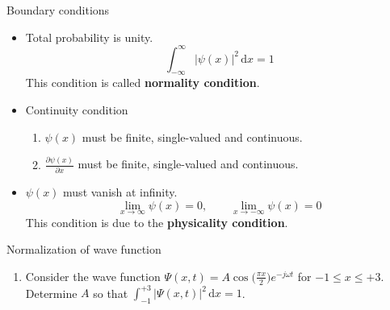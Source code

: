 \begin{frame}{Boundary conditions}
	\begin{itemize}
		\item Total probability is unity.
		\[
		\int_{-\infty}^{\infty} |\psi(x)|^2 \, \mathrm{d}x = 1
		\]
		This condition is called \textbf{normality condition}.
		\item Continuity condition
		\begin{enumerate}
			\item \(\psi(x)\) must be finite, single-valued and continuous.
			\item \(\tfrac{\partial\psi(x)}{\partial x}\) must be finite, single-valued and continuous.
		\end{enumerate}
		\item \(\psi(x)\) must vanish at infinity.
		\[
		\lim_{x\rightarrow\infty} \psi(x) = 0, \qquad \lim_{x\rightarrow -\infty} \psi(x) = 0
		\]
		This condition is due to the \textbf{physicality condition}.
	\end{itemize}
	\begin{problem}{Normalization of wave function}
		\begin{enumerate}
			\item Consider the wave function \(\Psi (x, t) = A \cos\big(\frac{\pi x}{2}\big) e^{-j \omega t}\) for \(-1 \leq x \leq +3\). Determine \(A\) so that \(\int_{-1}^{+3}|\Psi(x, t)|^2 \, \mathrm{d}x = 1\).
		\end{enumerate}
	\end{problem}
\end{frame}
%

